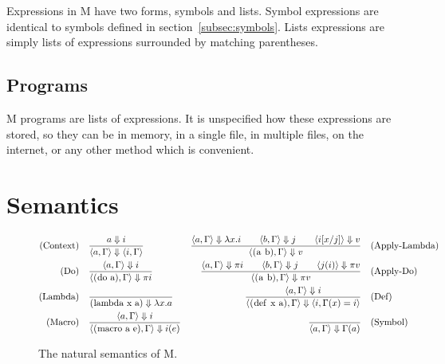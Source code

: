 \documentclass{article}
\begin{document}
\begin{multicols}{2}
        Expressions in M have two forms, symbols and lists.
        Symbol expressions are identical to symbols defined in section~\ref{subsec:symbols}.
        Lists expressions are simply lists of expressions surrounded by matching parentheses.

        \subsection{Programs}\label{subsec:programs}

        M programs are lists of expressions.
        It is unspecified how these expressions are stored, so they can be in memory, in a single file, in multiple files, on the internet, or any other method which is convenient.
    \end{multicols}
    \newpage

    \section{Semantics}\label{sec:semantics}

    \begin{figure}[h]
        \centering
        \begin{align*}
            \text{(Context)}\quad&\dfrac{a\Downarrow i}{\langle a,\Gamma\rangle\Downarrow\langle i,\Gamma\rangle}
            &\dfrac{\langle a,\Gamma\rangle\Downarrow\lambda x.i\qquad\langle b,\Gamma\rangle\Downarrow j\qquad\langle i[x/j]\rangle\Downarrow v}{\langle\lstinline$(a b)$,\Gamma\rangle\Downarrow v}\quad&\text{(Apply-Lambda)}\\
            \text{(Do)}\quad&\dfrac{\langle a,\Gamma\rangle\Downarrow i}{\langle\lstinline$(do a)$,\Gamma\rangle\Downarrow\pi i}
            &\dfrac{\langle a,\Gamma\rangle\Downarrow\pi i\qquad\langle b,\Gamma\rangle\Downarrow j\qquad\langle j(i)\rangle\Downarrow\pi v}{\langle\lstinline$(a b)$,\Gamma\rangle\Downarrow\pi v}\quad&\text{(Apply-Do)}\\
            \text{(Lambda)}\quad&\dfrac{}{\lstinline$(lambda x a)$\Downarrow\lambda x.a}
            &\dfrac{\langle a,\Gamma\rangle\Downarrow i}{\langle\lstinline$(def x a)$,\Gamma\rangle\Downarrow\langle i,\Gamma(x) = i\rangle}\quad&\text{(Def)}\\
            \text{(Macro)}\quad&\dfrac{\langle a,\Gamma\rangle\Downarrow i}{\langle\lstinline$(macro a e)$,\Gamma\rangle\Downarrow i(e)}
            &\dfrac{}{\langle a,\Gamma\rangle\Downarrow\Gamma(a)}\quad&\text{(Symbol)}
        \end{align*}
        \caption{The natural semantics of M.}
    \end{figure}
\end{document}
